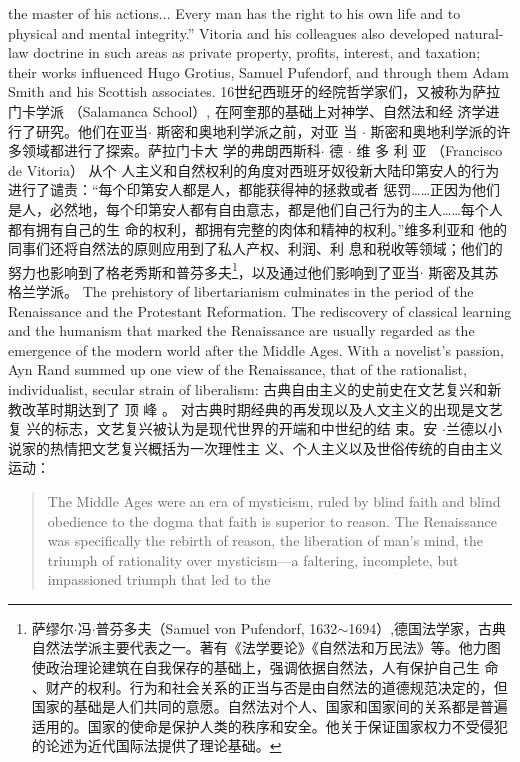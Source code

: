 \begin{paracol}{2}
the master of his actions$\ldots$ Every man has the right to his
own life and to physical and mental integrity.'' Vitoria and his
colleagues also developed natural-law doctrine in such areas as
private property, profits, interest, and taxation; their works influenced Hugo Grotius, Samuel Pufendorf, and through them
Adam Smith and his Scottish associates.
\switchcolumn
16世纪西班牙的经院哲学家们，又被称为萨拉门卡学派
（Salamanca School）, 在阿奎那的基础上对神学、自然法和经
济学进行了研究。他们在亚当$\cdot$ 斯密和奥地利学派之前，对亚
当 $\cdot$ 斯密和奥地利学派的许多领域都进行了探索。萨拉门卡大
学的弗朗西斯科$\cdot$ 德 $\cdot$ 维 多 利 亚 （Francisco de Vitoria） 从个
人主义和自然权利的角度对西班牙奴役新大陆印第安人的行为
进行了谴责：“每个印第安人都是人，都能获得神的拯救或者
惩罚……正因为他们是人，必然地，每个印第安人都有自由意志，都是他们自己行为的主人……每个人都有拥有自己的生
命的权利，都拥有完整的肉体和精神的权利。”维多利亚和
他的同事们还将自然法的原则应用到了私人产权、利润、利
息和税收等领域；他们的努力也影响到了格老秀斯和普芬多夫\footnote{萨缪尔$\cdot$冯$\cdot$普芬多夫（Samuel von Pufendorf, 1632$\sim$1694）,德国法学家，古典自然法学派主要代表之一。著有《法学要论》《自然法和万民法》等。他力图使政治理论建筑在自我保存的基础上，强调依据自然法，人有保护自己生	命 、财产的权利。行为和社会关系的正当与否是由自然法的道德规范决定的，但国家的基础是人们共同的意愿。自然法对个人、国家和国家间的关系都是普遍适用的。国家的使命是保护人类的秩序和安全。他关于保证国家权力不受侵犯的论述为近代国际法提供了理论基础。}，以及通过他们影响到了亚当$\cdot$ 斯密及其苏格兰学派。
\switchcolumn*
The prehistory of libertarianism culminates in the period of
the Renaissance and the Protestant Reformation. The rediscovery of classical learning and the humanism that marked the Renaissance are usually regarded as the emergence of the modern
world after the Middle Ages. With a novelist's passion, Ayn
Rand summed up one view of the Renaissance, that of the rationalist, individualist, secular strain of liberalism:
\switchcolumn
古典自由主义的史前史在文艺复兴和新教改革时期达到了
顶 峰 。 对古典时期经典的再发现以及人文主义的出现是文艺复
兴的标志，文艺复兴被认为是现代世界的开端和中世纪的结
束。安 $\cdot$兰德以小说家的热情把文艺复兴概括为一次理性主
义、个人主义以及世俗传统的自由主义运动：
\switchcolumn*
\begin{quote}
The Middle Ages were an era of mysticism, ruled by blind faith
and blind obedience to the dogma that faith is superior to reason.
The Renaissance was specifically the rebirth of reason, the liberation of man's mind, the triumph of rationality over mysticism---a faltering, incomplete, but impassioned triumph that led to the

\end{quote}
\end{paracol}
